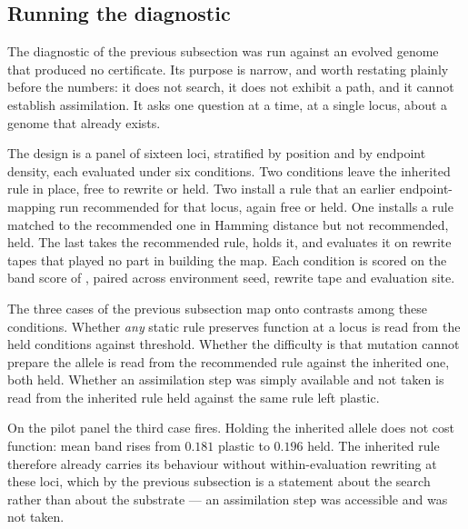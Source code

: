 
\subsection{Running the diagnostic}
\label{sec:diagnostic-run}

The diagnostic of the previous subsection was run against an evolved genome that
produced no certificate. Its purpose is narrow, and worth restating plainly before
the numbers: it does not search, it does not exhibit a path, and it cannot
establish assimilation. It asks one question at a time, at a single locus, about a
genome that already exists.

The design is a panel of sixteen loci, stratified by position and by endpoint
density, each evaluated under six conditions. Two conditions leave the inherited
rule in place, free to rewrite or held. Two install a rule that an earlier
endpoint-mapping run recommended for that locus, again free or held. One installs a
rule matched to the recommended one in Hamming distance but not recommended, held.
The last takes the recommended rule, holds it, and evaluates it on rewrite tapes
that played no part in building the map. Each condition is scored on the band score
of , paired across environment seed, rewrite tape and
evaluation site.

The three cases of the previous subsection map onto contrasts among these
conditions. Whether \emph{any} static rule preserves function at a locus is read
from the held conditions against threshold. Whether the difficulty is that mutation
cannot prepare the allele is read from the recommended rule against the inherited
one, both held. Whether an assimilation step was simply available and not taken is
read from the inherited rule held against the same rule left plastic.

On the pilot panel the third case fires. Holding the inherited allele does not cost
function: mean band rises from $0.181$ plastic to $0.196$ held. The inherited rule
therefore already carries its behaviour without within-evaluation rewriting at these
loci, which by the previous subsection is a statement about the search rather than
about the substrate --- an assimilation step was accessible and was not taken.

